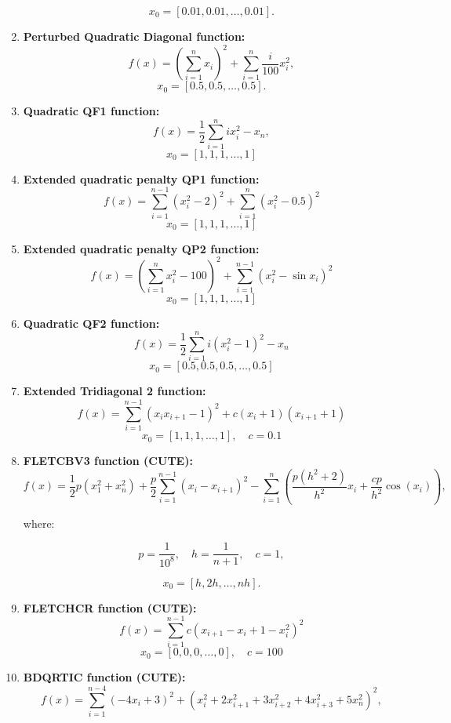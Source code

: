 \begin{enumerate}
    \[
    x_0 = [0.01, 0.01, \ldots, 0.01].
    \]

    \item \textbf{Perturbed Quadratic Diagonal function:}
    \[
    f(x) = \left(\sum_{i=1}^{n}  x_i\right)^2 + \sum_{i=1}^n \frac{i}{100} x_i^2,
    \]
    \[
    x_0 = [0.5, 0.5, \dots, 0.5].
    \]

    \item \textbf{Quadratic QF1 function:}
    \[
    f(x) = \frac{1}{2} \sum_{i=1}^{n} i x_i^2 - x_n,
    \]
    \[
    x_0 = [1, 1, 1, \dots, 1]
    \]

    \item \textbf{Extended quadratic penalty QP1 function:}
    \[
    f(x) = \sum_{i=1}^{n-1} \left(x_i^2 - 2\right)^2 + \sum_{i=1}^{n} \left(x_i^2 - 0.5\right)^2
    \]
    \[
    x_0 = [1, 1, 1, \dots, 1]
    \]

    \item \textbf{Extended quadratic penalty QP2 function:}
    \[
    f(x) =\left( \sum_{i=1}^{n} x_i^2 - 100\right)^2 + \sum_{i=1}^{n-1} \left(x_i^2 - \sin x_i \right)^2
    \]
    \[
    x_0 = [1, 1, 1, \dots, 1]
    \]

    \item \textbf{Quadratic QF2 function:}
    \[
    f(x) =  \frac{1}{2} \sum_{i=1}^{n} i\left( x_i^2 - 1\right)^2 - x_n
    \]
    \[
    x_0 = [0.5, 0.5, 0.5, \dots, 0.5]
    \]

    \item \textbf{Extended Tridiagonal 2 function:}
    \[
    f(x) = \sum_{i=1}^{n-1}(x_ix_{i+1} - 1)^2 + c(x_i + 1)(x_{i+1} + 1)
    \]
    \[
    x_0 = [1, 1, 1, \dots, 1], \quad c = 0.1
    \]

    \item \textbf{FLETCBV3 function (CUTE):}
    \[
    f(x) = \frac{1}{2}p(x_1^2 + x_n^2) + \frac{p}{2}\sum_{i=1}^{n-1} (x_i - x_{i+1})^2 - \sum_{i=1}^{n} \left( \frac{p(h^2 + 2)}{h^2} x_i + \frac{c p}{h^2} \cos(x_i) \right),
    \]

    where:

    \[
    p = \frac{1}{10^8}, \quad h = \frac{1}{n + 1}, \quad c = 1,
    \]

    \[
    x_0 = [h, 2h, \ldots, n h].
    \]

    \item \textbf{FLETCHCR function (CUTE):}
    \[
    f(x) = \sum_{i=1}^{n-1}  c (x_{i+1} - x_i + 1 - x_i^2)^2 
    \]
    \[
    x_0 = [0, 0, 0, \dots, 0], \quad c = 100
    \]

    \item \textbf{BDQRTIC function (CUTE):}
    \[
    f(x) = \sum_{i=1}^{n-4} (-4 x_i + 3)^2 + \left( x_i^2 + 2 x_{i+1}^2 + 3 x_{i+2}^2 + 4 x_{i+3}^2 + 5 x_n^2 \right)^2,
    \]


\end{enumerate}
